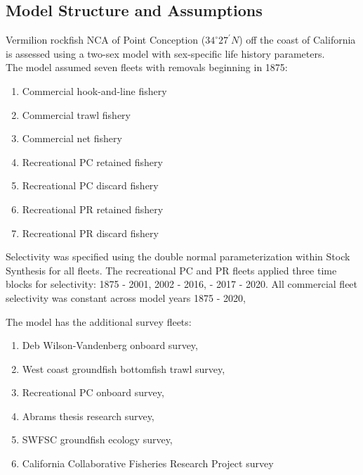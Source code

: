 \documentclass[11pt,
  english,
  a4paper,
]{article}
\begin{document}
\hypertarget{model-structure-and-assumptions}{%
\subsection{Model Structure and Assumptions}\label{model-structure-and-assumptions}}

\leavevmode\tagmcend\tagstructend

Vermilion rockfish NCA of Point Conception ($34^\circ 27^\prime N$) off the coast of California is assessed using a two-sex model with sex-specific life history parameters.\\
The model assumed seven fleets with removals beginning in 1875:

\begin{enumerate}
  \item Commercial hook-and-line fishery
  \item Commercial trawl fishery
  \item Commercial net fishery
  \item Recreational PC retained fishery
  \item Recreational PC discard fishery
  \item Recreational PR retained fishery
  \item Recreational PR discard fishery
\end{enumerate}

Selectivity was specified using the double normal parameterization within Stock Synthesis for all fleets. The recreational PC and PR fleets applied three time blocks for selectivity: 1875 - 2001, 2002 - 2016, - 2017 - 2020. All commercial fleet selectivity was constant across model years 1875 - 2020,

The model has the additional survey fleets:

\begin{enumerate}
 \item Deb Wilson-Vandenberg onboard survey,
 \item West coast groundfish bottomfish trawl survey,
 \item Recreational PC onboard survey,
 \item Abrams thesis research survey,
 \item SWFSC groundfish ecology survey,
 \item California Collaborative Fisheries Research Project survey
\end{enumerate}

\end{document}
